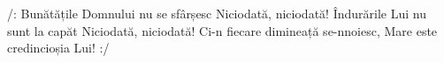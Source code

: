 \beginverse
/: Bunătățile Domnului nu se sfârșesc
Niciodată, niciodată!
Îndurările Lui nu sunt la capăt
Niciodată, niciodată!
Ci-n fiecare dimineață se-nnoiesc,
Mare este credincioșia Lui! :/
\endverse
\endsong